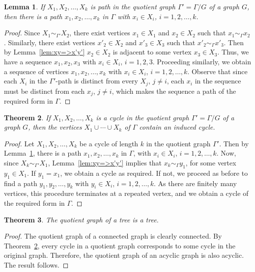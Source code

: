 \documentclass[12pt,a4paper]{amsart}
\newtheorem{Theorem}{Theorem}[section]
\newtheorem{Lemma}[Theorem]{Lemma}
\theoremstyle{remark}
\theoremstyle{definition}
\newcommand{\adj}[1]{\sim_{\scriptscriptstyle #1}}
\begin{document}
\begin{Lemma}
\label{lem:PathCorr}
If $X_1, X_2, \ldots, X_k$ is path in the quotient graph $\Gamma' = \Gamma/G$ of a graph $G$, then there is a path $x_1, x_2, \ldots, x_k$ in $\Gamma$ with $x_i \in X_i$, $i = 1, 2, \ldots, k$.
\end{Lemma}
\begin{proof}
Since $X_1 \adj{\Gamma'} X_2$, there exist vertices $x_1 \in X_1$ and $x_2 \in X_2$ such that $x_1 \adj{\Gamma} x_2$. Similarly, there exist vertices $x'_2 \in X_2$ and $x'_3 \in X_3$ such that $x'_2 \adj{\Gamma} x'_3$. Then by Lemma~\ref{lem:xy=>x'y'} $x_2 \in X_2$ is adjacent to some vertex $x_3 \in X_3$. Thus, we have a sequence $x_1, x_2, x_3$ with $x_i \in X_i$, $i = 1, 2, 3$. Proceeding similarly, we obtain a sequence of vertices $x_1, x_2, \ldots, x_k$ with $x_i \in X_i$, $i = 1, 2, \ldots, k$. Observe that since each $X_i$ in the $\Gamma'$-path is distinct from every $X_j$, $j \ne i$, each $x_i$ in the sequence must be distinct from each $x_j$, $j \ne i$, which makes the sequence a path of the required form in $\Gamma$.
\end{proof}

\begin{Theorem}
\label{thm:CycCorr}
If $X_1, X_2, \ldots, X_k$ is a cycle in the quotient graph $\Gamma' = \Gamma/G$ of a graph $G$, then the vertices $X_1 \cup \cdots \cup X_k$ of $\Gamma$ contain an induced cycle.
\end{Theorem}
\begin{proof}
Let $X_1, X_2, \ldots, X_k$ be a cycle of length $k$ in the quotient graph $\Gamma'$. Then by Lemma~\ref{lem:PathCorr}, there is a path $x_1, x_2, \ldots, x_k$ in $\Gamma$, with $x_i \in X_i$, $i = 1, 2, \ldots, k$. Now, since $X_k \adj{\Gamma'} X_1$, Lemma~\ref{lem:xy=>x'y'} implies that $x_k \adj{\Gamma} y_1$, for some vertex $y_1 \in X_1$. If $y_1 = x_1$, we obtain a cycle as required. If not, we proceed as before to find a path $y_1, y_2, \ldots, y_k$ with $y_i \in X_i$, $i = 1, 2, \ldots, k$. As there are finitely many vertices, this procedure terminates at a repeated vertex, and we obtain a cycle of the required form in $\Gamma$.
\end{proof}

\begin{Theorem}
\label{thm:TreeQuot}
The quotient graph of a tree is a tree.
\end{Theorem}
\begin{proof}
The quotient graph of a connected graph is clearly connected. By Theorem~\ref{thm:CycCorr}, every cycle in a quotient graph corresponds to some cycle in the original graph. Therefore, the quotient graph of an acyclic graph is also acyclic. The result follows.
\end{proof}
\end{document}
